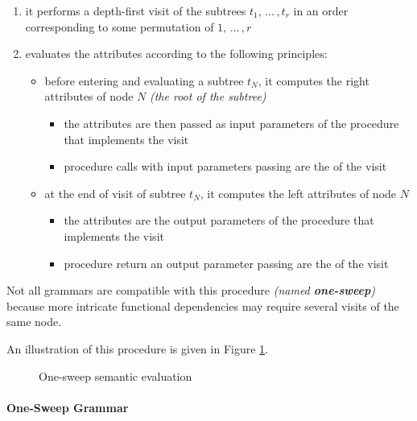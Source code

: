 \documentclass[english]{article}
\begin{document}
\begin{enumerate}[label=\arabic*, ref=(\arabic*)]
  \item it performs a depth-first visit of the subtrees \(t_1, \,\ldots\,, t_r\) in an order corresponding to some permutation of \(1, \,\ldots\,, r\)
  \item evaluates the attributes according to the following principles:
        \begin{itemize}
          \item before entering and evaluating a subtree \(t_N\), it computes the right attributes of node \(N\) \textit{(the root of the subtree)}
                \begin{itemize}[label=\(\rightarrow\)]
                  \item the attributes are then passed as input parameters of the procedure that implements the visit
                  \item procedure calls with input parameters passing are the  of the visit
                \end{itemize}
          \item at the end of visit of subtree \(t_N\), it computes the left attributes of node \(N\)
                \begin{itemize}[label=\(\rightarrow\)]
                  \item the attributes are the output parameters of the procedure that implements the visit
                  \item procedure return an output parameter passing are the  of the visit
                \end{itemize}
        \end{itemize}
\end{enumerate}

Not all grammars are compatible with this procedure \textit{(named \textbf{one-sweep})} because more intricate functional dependencies may require several visits of the same node.

An illustration of this procedure is given in Figure \ref{fig:one-sweep}.

\begin{figure}
  \centering
  \bigskip
  \caption{One-sweep semantic evaluation}
  \label{fig:one-sweep}
  \bigskip
\end{figure}

\paragraph{One-Sweep Grammar}
\label{par:one-sweep-grammar}
\end{document}
